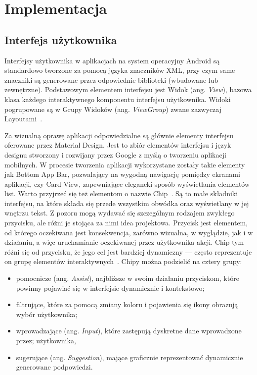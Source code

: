 \newpage
\section{Implementacja}
    \subsection{Interfejs użytkownika}\label{interface}
    Interfejsy użytkownika w aplikacjach na system operacyjny Android są standardowo tworzone za pomocą języka znaczników XML, przy czym same znaczniki są generowane przez odpowiednie biblioteki 
    (wbudowane lub zewnętrzne). Podstawowym elementem interfejsu jest Widok (ang. \emph{View}), bazowa klasa każdego interaktywnego komponentu interfejsu użytkownika. Widoki pogrupowane są w Grupy 
    Widoków (ang. \emph{ViewGroup}) zwane zazwyczaj Layoutami~\cite{VIEW}. 

    Za wizualną oprawę aplikacji odpowiedzialne są głównie elementy interfejsu oferowane przez Material Design. Jest to zbiór elementów interfejsu i język designu stworzony i rozwijany przez Google 
    z myślą o tworzeniu aplikacji mobilnych. W procesie tworzenia aplikacji wykorzystane zostały takie elementy jak Bottom App Bar, pozwalający na wygodną nawigację pomiędzy ekranami aplikacji, czy
    Card View, zapewniające elegancki sposób wyświetlania elementów list. Warto przyjrzeć się też elementom o nazwie Chip~\cite{CHIPS}. Są to małe składniki interfejsu, na które składa  
    się przede wszystkim obwódka oraz wyświetlany w jej wnętrzu tekst. Z pozoru mogą wydawać się szczególnym rodzajem zwykłego przycisku, ale różni je stojąca za nimi idea projektowa. Przycisk jest elementem, od którego 
    oczekiwana jest konsekwencja, zarówno wizualna, w wyglądzie, jak i w działaniu, a więc  uruchamianie oczekiwanej przez użytkownika akcji. Chip tym różni się od przycisku, że jego cel jest bardziej dynamiczny --- 
    często reprezentuje on grupę elementów interaktywnych~\cite{CHIPS_GL}. Chipy można podzielić na cztery grupy: 
    
    \begin{itemize}
    	\item 
    pomocnicze (ang. \emph{Assist}), najbliższe w swoim działaniu przyciskom, które powinny pojawiać się w
    interfejsie dynamicznie i kontekstowo;
    \item filtrujące, które za pomocą zmiany koloru i pojawienia się ikony obrazują wybór użytkownika;
    \item  wprowadzające (ang. \emph{Input}), które zastępują dyskretne dane wprowadzone przez;
    użytkownika, 
    \item sugerujące (ang. \emph{Suggestion}), mające graficznie reprezentować dynamicznie generowane podpowiedzi. 
        \end{itemize}


